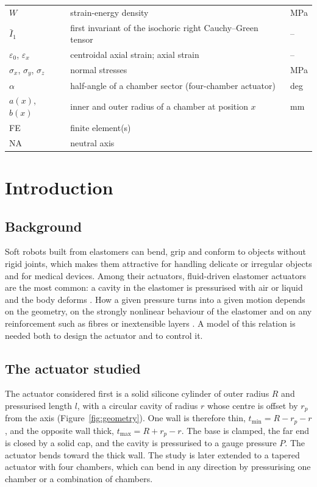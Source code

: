 \documentclass[12pt,a4paper,oneside]{report}
\numberwithin{equation}{chapter}
\numberwithin{figure}{chapter}
\numberwithin{table}{chapter}
\newcommand{\rp}{r_p}
\newcommand{\tmin}{t_{\min}}
\newcommand{\tmax}{t_{\max}}
\begin{document}
\begin{longtable}{@{}p{2.4cm}p{9.8cm}l@{}}
$W$ & strain-energy density & MPa\\
$\bar I_1$ & first invariant of the isochoric right Cauchy--Green tensor & --\\
$\varepsilon_0$, $\varepsilon_x$ & centroidal axial strain; axial strain & --\\
$\sigma_x$, $\sigma_y$, $\sigma_z$ & normal stresses & MPa\\
$\alpha$ & half-angle of a chamber sector (four-chamber actuator) & deg\\
$a(x)$, $b(x)$ & inner and outer radius of a chamber at position $x$ & mm\\
\midrule
FE & finite element(s) & \\
NA & neutral axis & \\
\bottomrule
\end{longtable}

\clearpage
{}

\chapter{Introduction}\label{ch:intro}

\section{Background}
Soft robots built from elastomers can bend, grip and conform to objects without rigid joints, which makes
them attractive for handling delicate or irregular objects and for medical devices. Among their actuators,
fluid-driven elastomer actuators are the most common: a cavity in the elastomer is pressurised with air or
liquid and the body deforms \cite{gorissen2017,marchese2015}. How a given pressure turns into a given
motion depends on the geometry, on the strongly nonlinear behaviour of the elastomer and on any
reinforcement such as fibres or inextensible layers \cite{polygerinos2015,connolly2017}. A model of this
relation is needed both to design the actuator and to control it.

\section{The actuator studied}
The actuator considered first is a solid silicone cylinder of outer radius $R$ and pressurised length $l$,
with a circular cavity of radius $r$ whose centre is offset by $\rp$ from the axis (Figure~\ref{fig:geometry}).
One wall is therefore thin, $\tmin=R-\rp-r$, and the opposite wall thick, $\tmax=R+\rp-r$. The base is clamped,
the far end is closed by a solid cap, and the cavity is pressurised to a gauge pressure $P$. The actuator
bends toward the thick wall. The study is later extended to a tapered actuator with four chambers, which can
bend in any direction by pressurising one chamber or a combination of chambers.
\end{document}
